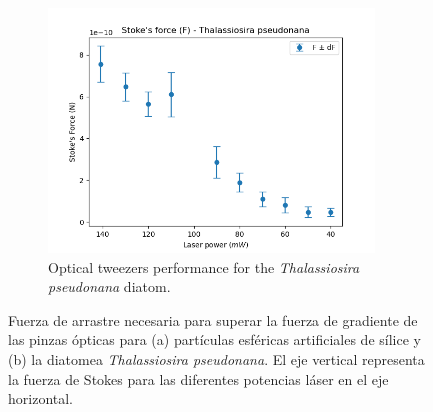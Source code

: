 \documentclass[10pt,aspectratio=1610,compress,dvipsnames]{beamer}
\begin{document}
\begin{frame}
{\begin{figure}[H]
\begin{subfigure}[b]{0.49\textwidth}
         \includegraphics[width=0.95\textwidth]{Newplots_microfluidics_results/Force_Thalassiosira.png}
         \caption{Optical tweezers performance for the \textit{Thalassiosira pseudonana} diatom.}
         \label{figx}
     \end{subfigure}
     \caption{Fuerza de arrastre necesaria para superar la fuerza de gradiente de las pinzas ópticas para (a) partículas esféricas artificiales de sílice y (b) la diatomea \textit{Thalassiosira pseudonana}. El eje vertical representa la fuerza de Stokes para las diferentes potencias láser en el eje horizontal.}
     \hfill
    \label{forces_microfluidcs} 
\end{figure}



}


\end{frame}








\end{document}
